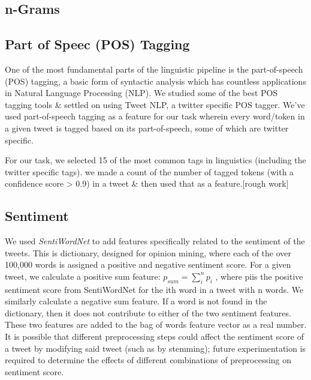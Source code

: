 \subsection{n-Grams} %
\label{sub:n_grams}


\subsection{Part of Speec (POS) Tagging} %
\label{sub:part_of_speec_}

One of the most fundamental parts of the linguistic pipeline is the part-of-speech (POS) tagging, a basic form of syntactic analysis which has countless applications in Natural Language Processing (NLP). We studied some of the best POS tagging tools \& settled on using Tweet NLP, a twitter specific POS tagger. We’ve used part-of-speech tagging as a feature for our task wherein every word/token in a given tweet is tagged based on its part-of-speech, some of which are twitter specific.

For our task, we selected 15 of the most common tags in linguistics (including the twitter specific tags). we made a count of the number of tagged tokens (with a confidence score > 0.9) in a tweet \& then used that as a feature.[rough work]


\subsection{Sentiment} %
\label{sub:sentiment}

We used \textit{SentiWordNet} to add features specifically related to the sentiment of the tweets. This is dictionary, designed for opinion mining, where each of the over 100,000 words is assigned a positive and negative sentiment score. For a given tweet, we calculate a positive sum feature: $p_{sum} = \sum_{i}^n p_i$ , where piis the positive sentiment score from SentiWordNet for the ith word in a tweet with n words. We similarly calculate a negative sum feature. If a word is not found in the dictionary, then it does not contribute to either of the two sentiment features. These two features are added to the bag of words feature vector as a real number. It is possible that different preprocessing steps could affect the sentiment score of a tweet by modifying said tweet (such as by stemming); future experimentation is required to determine the effects of different combinations of preprocessing on sentiment score.


